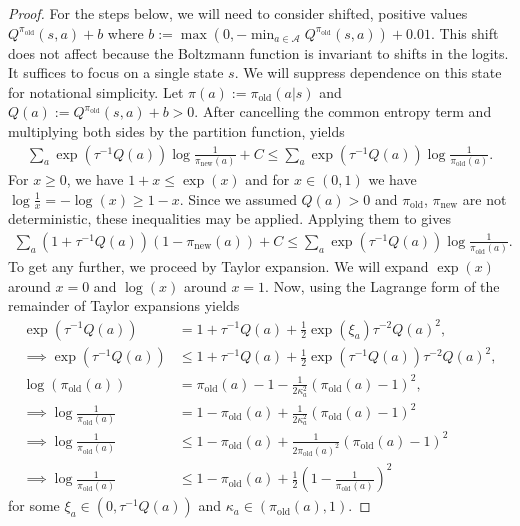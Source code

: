 \documentclass[twoside,11pt]{article}
\newcommand{\actionspace}{\mathcal{A}}
\newcommand{\pinew}{{\pi_\mathrm{new}}}
\newcommand{\piold}{{\pi_\mathrm{old}}}
\newcommand{\defeq}{:=}
\begin{document}
\begin{proof}

For the steps below, we will need to consider shifted, positive values $Q^{\piold}(s, a) + b $ where $b \defeq \max(0, -\min_{a \in \actionspace} Q^{\piold}(s,a)) + 0.01$. This shift does not affect  because the Boltzmann function is invariant to shifts in the logits. 
It suffices to focus on a single state $s$. We will suppress dependence on this state for notational simplicity. Let $\pi(a) \defeq \piold(a | s)$ and $Q(a) \defeq Q^{\piold}(s, a) + b > 0$. After cancelling the common entropy term and multiplying both sides by the partition function,  yields
\begin{align}\label{eq:first-ineq}
    \sum_a \exp(\tau^{-1} Q(a)) \log \frac{1}{\pinew(a)} + C \leq \sum_a \exp(\tau^{-1} Q(a)) \log \frac{1}{\piold(a)}.
\end{align}
For $x \geq 0$, we have $1 + x \leq \exp(x)$ and for $x \in (0, 1)$ we have $ \log \frac{1}{x} = -\log(x) \geq 1 - x$. Since we assumed $Q(a) > 0$ and $\piold$, $\pinew$ are not deterministic, these inequalities may be applied. Applying them to  gives
\begin{align}\label{eq:second-ineq}
    \sum_a (1 + \tau^{-1} Q(a)) (1 - \pinew(a)) + C \leq \sum_a \exp(\tau^{-1} Q(a)) \log\frac{1}{\piold(a)}.
\end{align}
To get any further, we proceed by Taylor expansion. We will expand $\exp(x)$ around $x = 0$ and $\log (x)$ around $x = 1$. Now, using the Lagrange form of the remainder of Taylor expansions yields
\begin{align*}
    \exp(\tau^{-1} Q(a)) &= 1 + \tau^{-1} Q(a) + \frac{1}{2}\exp(\xi_a) \tau^{-2} Q(a)^2,\\
    \implies \exp(\tau^{-1} Q(a)) &\leq 1 + \tau^{-1} Q(a) + \frac{1}{2}\exp(\tau^{-1} Q(a)) \tau^{-2} Q(a)^2,\\
    \log(\piold(a)) &= \piold(a) - 1 - \frac{1}{2\kappa_a^2} (\piold(a) - 1)^2,\\
    \implies \log \frac{1}{\piold(a)} &= 1 - \piold(a) + \frac{1}{2\kappa_a^2} (\piold(a) - 1)^2\\
    \implies \log \frac{1}{\piold(a)} &\leq 1 - \piold(a) + \frac{1}{2\piold(a)^2} (\piold(a) - 1)^2\\
    \implies \log \frac{1}{\piold(a)} &\leq 1 - \piold(a) + \frac{1}{2} \left(1 - \frac{1}{\piold(a)}\right)^2
\end{align*}
for some $\xi_a \in (0, \tau^{-1}Q(a))$ and $\kappa_a \in (\piold(a), 1)$. 

\end{proof}
\end{document}
